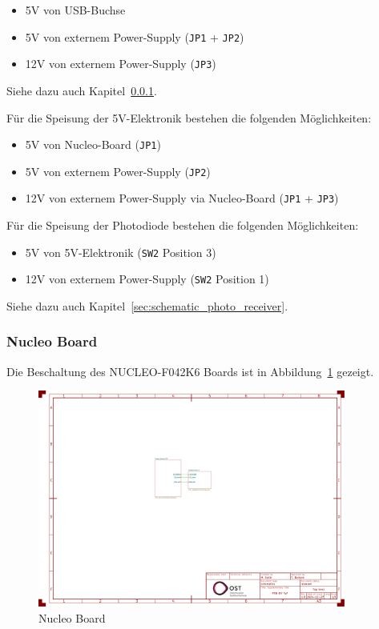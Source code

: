 \begin{itemize}
    \item 5V von USB-Buchse
    \item 5V von externem Power-Supply (\lstinline|JP1| + \lstinline|JP2|)
    \item 12V von externem Power-Supply (\lstinline|JP3|)
\end{itemize}

Siehe dazu auch Kapitel~\ref{sec:schematic_nucleo}.

Für die Speisung der 5V-Elektronik bestehen die folgenden Möglichkeiten:

\begin{itemize}
    \item 5V von Nucleo-Board (\lstinline|JP1|)
    \item 5V von externem Power-Supply (\lstinline|JP2|)
    \item 12V von externem Power-Supply via Nucleo-Board (\lstinline|JP1| + \lstinline|JP3|)
\end{itemize}

Für die Speisung der Photodiode bestehen die folgenden Möglichkeiten:

\begin{itemize}
    \item 5V von 5V-Elektronik (\lstinline|SW2| Position 3)
    \item 12V von externem Power-Supply (\lstinline|SW2| Position 1)
\end{itemize}

Siehe dazu auch Kapitel~\ref{sec:schematic_photo_receiver}.

\subsubsection{Nucleo Board}\label{sec:schematic_nucleo}

Die Beschaltung des NUCLEO-F042K6 Boards \cite{st2024nucleof042k6_usermanual} ist in Abbildung~\ref{fig:nucleo_board}
gezeigt.

\begin{figure}[H]
    \centering
    \includegraphics[page=2, trim=530 580 300 50, clip, width=0.9\textwidth]{attachments/schematic.pdf}
    \caption{Nucleo Board}\label{fig:nucleo_board}
\end{figure}

